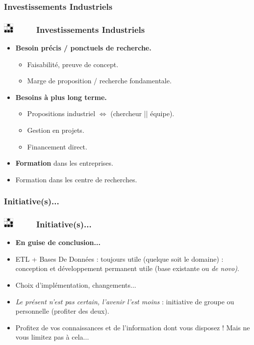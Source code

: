 \documentclass[slidetop,11pt]{beamer}
\def\sectionPartIIIcDE{Investissements Industriels}
\def\sectionPartIIIcTR{Initiative(s)...}
\def\moreInFrameTitle{\includegraphics[height=0.5cm]{img/logo_glider.png}~~~~~}
\begin{document}
\subsubsection{\sectionPartIIIcDE}
\begin{frame}
	\frametitle{\moreInFrameTitle \sectionPartIIIcDE}
	\begin{itemize}
		\item<1-> \textbf<1-1>{Besoin pr{\'e}cis / ponctuels de recherche. }
		\begin{itemize}
			\item Faisabilit{\'e}, preuve de concept. 
			\item Marge de proposition / recherche fondamentale. 
		\end{itemize}
		\item<2-> \textbf<2-2>{Besoins {\`a} plus long terme. }
		\begin{itemize}
			\item Propositions industriel $ \Leftrightarrow $ (chercheur || {\'e}quipe). 
			\item Gestion en projets. 
			\item Financement direct. 
		\end{itemize}
		\item<3-> \textbf<3-3>{Formation} dans les entreprises. 
		\item<3-> Formation dans les centre de recherches. 
	\end{itemize}
\end{frame} 

\subsubsection{\sectionPartIIIcTR}
\begin{frame}
	\frametitle{\moreInFrameTitle \sectionPartIIIcTR}
	\begin{itemize}
		\item \textbf{En guise de conclusion...}
		\item ETL + Bases De Donn{\'e}es : toujours utile (quelque soit le domaine) : conception et d{\'e}veloppement permanent utile (base existante ou \emph{de novo)}. 
		\item Choix d'impl{\'e}mentation, changements...
		\item \emph{Le pr{\'e}sent n'est pas certain, l'avenir l'est moins} : initiative de groupe ou personnelle (profiter des deux). 
		\item Profitez de vos connaissances et de l'information dont vous disposez ! Mais ne vous limitez pas {\`a} cela...
	\end{itemize}
\end{frame} 
\end{document}
